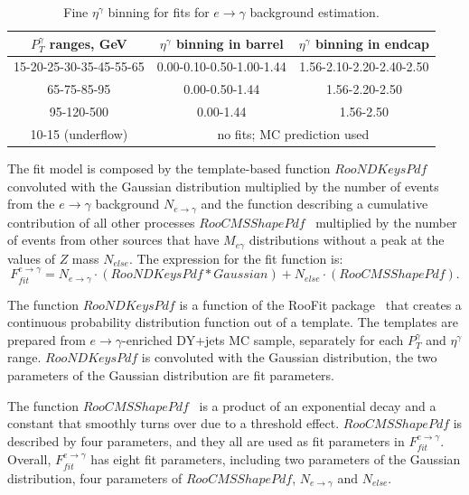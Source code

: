\begin{table}[h]
  \small
  \begin{center}
    \caption{Fine $\eta^{\gamma}$ binning for fits for $e\rightarrow\gamma$ background estimation.}
    \begin{tabular}{|c|c|c|}
      \hline
      $P_T^{\gamma}$ ranges, GeV & $\eta^{\gamma}$ binning in barrel &$\eta^{\gamma}$ binning in endcap  \\ \hline
      15-20-25-30-35-45-55-65 & 0.00-0.10-0.50-1.00-1.44 & 1.56-2.10-2.20-2.40-2.50  \\ \hline
      65-75-85-95 & 0.00-0.50-1.44 & 1.56-2.20-2.50  \\ \hline
      95-120-500 & 0.00-1.44 & 1.56-2.50  \\ \hline
      10-15 (underflow) & \multicolumn{2}{|c|}{no fits; MC prediction used} \\ \hline
    \end{tabular}
    \label{tab:fine_eta_binning}
  \end{center}
\end{table} 


The fit model is composed by the template-based function $RooNDKeysPdf$~\cite{ref_RooFit} convoluted with the Gaussian distribution multiplied by the number of events from the $e\rightarrow\gamma$ background  $N_{e\rightarrow\gamma}$ and the function describing a cumulative contribution of all other processes $RooCMSShapePdf$~\cite{ref_RooCMSShapePdf} multiplied by the number of events from other sources that have $M_{e\gamma}$ distributions without a peak at the values of $Z$ mass $N_{else}$. The expression for the fit function is:
\begin{equation}\label{eq:fit_function_etog}
F_{fit}^{e\rightarrow\gamma} = N_{e\rightarrow\gamma} \cdot (RooNDKeysPdf \ast Gaussian) +  N_{else} \cdot (RooCMSShapePdf).
\end{equation}

The function $RooNDKeysPdf$ is a function of the RooFit package~\cite{ref_RooFit} that creates a continuous probability distribution function out of a template. The templates are prepared from $e\rightarrow\gamma$-enriched DY+jets MC sample, separately for each $P_T^{\gamma}$ and $\eta^\gamma$ range. $RooNDKeysPdf$ is convoluted with the Gaussian distribution, the two parameters of the Gaussian distribution are fit parameters. 

The function $RooCMSShapePdf$~\cite{ref_RooCMSShapePdf} is a product of an exponential decay and a constant that smoothly turns over due to a threshold effect. $RooCMSShapePdf$ is described by four parameters, and they all are used as fit parameters in $F_{fit}^{e\rightarrow\gamma}$. Overall,  $F_{fit}^{e\rightarrow\gamma}$ has eight fit parameters, including two parameters of the Gaussian distribution, four parameters of $RooCMSShapePdf$, $N_{e\rightarrow\gamma}$ and $N_{else}$.

